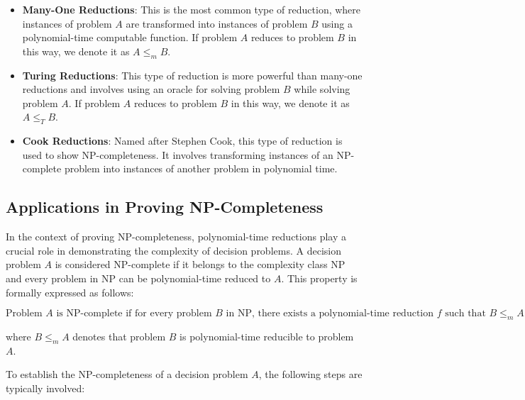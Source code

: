 \documentclass[12pt]{book} %
\begin{document}
\begin{itemize}
    \item \textbf{Many-One Reductions}: This is the most common type of reduction, where instances of problem \(A\) are transformed into instances of problem \(B\) using a polynomial-time computable function. If problem \(A\) reduces to problem \(B\) in this way, we denote it as \(A \leq_m B\).
    
    \item \textbf{Turing Reductions}: This type of reduction is more powerful than many-one reductions and involves using an oracle for solving problem \(B\) while solving problem \(A\). If problem \(A\) reduces to problem \(B\) in this way, we denote it as \(A \leq_T B\).
    
    \item \textbf{Cook Reductions}: Named after Stephen Cook, this type of reduction is used to show NP-completeness. It involves transforming instances of an NP-complete problem into instances of another problem in polynomial time.
\end{itemize}

\subsection{Applications in Proving NP-Completeness}
In the context of proving NP-completeness, polynomial-time reductions play a crucial role in demonstrating the complexity of decision problems. A decision problem \(A\) is considered NP-complete if it belongs to the complexity class NP and every problem in NP can be polynomial-time reduced to \(A\). This property is formally expressed as follows:

\[
\text{{Problem }} A \text{{ is NP-complete if for every problem }} B \text{{ in NP, there exists a polynomial-time reduction }} f \text{{ such that }} B \leq_m A
\]

where \(B \leq_m A\) denotes that problem \(B\) is polynomial-time reducible to problem \(A\).

To establish the NP-completeness of a decision problem \(A\), the following steps are typically involved:
\end{document}

